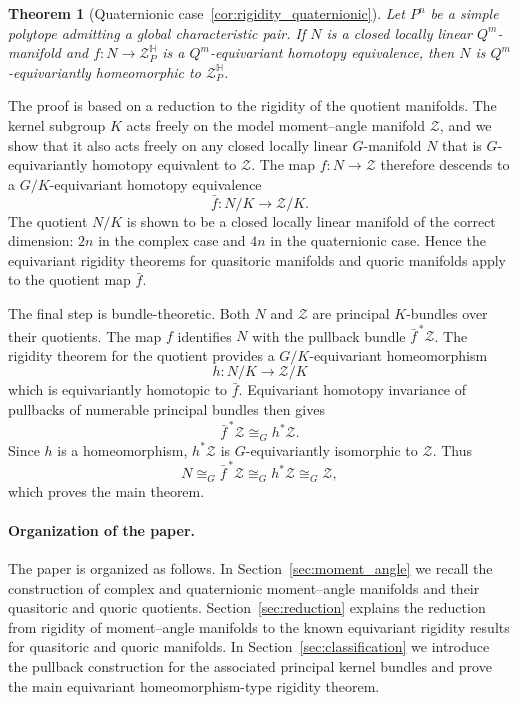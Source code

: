 \documentclass[11pt,a4paper]{article}
\numberwithin{equation}{section}
\newtheorem*{theorem}{Theorem}
\theoremstyle{named}
\begin{document}
\begin{theorem}[Quaternionic case~\ref{cor:rigidity_quaternionic}]
Let \(P^n\) be a simple polytope admitting a global characteristic pair. If \(N\) is a closed locally linear \(Q^m\)-manifold and \(f:N\longrightarrow \mathcal Z_P^{\mathbb H}\) is a \(Q^m\)-equivariant homotopy equivalence, then \(N\) is \(Q^m\)-equivariantly homeomorphic to \(\mathcal Z_P^{\mathbb H}\).
\end{theorem}

The proof is based on a reduction to the rigidity of the quotient manifolds. The kernel subgroup \(K\) acts freely on the model moment--angle manifold \(\mathcal Z\), and we show that it also acts freely on any closed locally linear \(G\)-manifold \(N\) that is \(G\)-equivariantly homotopy equivalent to \(\mathcal Z\). The map \(f:N\to\mathcal Z\) therefore descends to a \(G/K\)-equivariant homotopy equivalence
\[
    \bar f:N/K\longrightarrow \mathcal Z/K.
\]
The quotient \(N/K\) is shown to be a closed locally linear manifold of the correct dimension: \(2n\) in the complex case and \(4n\) in the quaternionic case. Hence the equivariant rigidity theorems for quasitoric manifolds \cite{mp} and quoric manifolds \cite{gp} apply to the quotient map \(\bar f\).

The final step is bundle-theoretic. Both \(N\) and \(\mathcal Z\) are principal \(K\)-bundles over their quotients. The map \(f\) identifies \(N\) with the pullback bundle \(\bar f^{\,*}\mathcal Z\). The rigidity theorem for the quotient provides a \(G/K\)-equivariant homeomorphism
\[
    h:N/K\longrightarrow \mathcal Z/K
\]
which is equivariantly homotopic to \(\bar f\). Equivariant homotopy invariance of pullbacks of numerable principal bundles then gives
\[
    \bar f^{\,*}\mathcal Z\cong_G h^*\mathcal Z.
\]
Since \(h\) is a homeomorphism, \(h^*\mathcal Z\) is
\(G\)-equivariantly isomorphic to \(\mathcal Z\).  Thus
\[
    N
    \cong_G
    \bar f^{\,*}\mathcal Z
    \cong_G
    h^*\mathcal Z
    \cong_G
    \mathcal Z,
\]
which proves the main theorem.

\medskip

\paragraph{Organization of the paper.}
The paper is organized as follows.  In Section~\ref{sec:moment_angle} we recall the construction of complex and quaternionic moment--angle manifolds and their quasitoric and quoric quotients.  Section~\ref{sec:reduction} explains the reduction from rigidity of moment--angle manifolds to the known equivariant rigidity results for quasitoric and quoric manifolds. In Section~\ref{sec:classification} we introduce the pullback construction for the associated principal kernel bundles and prove the main equivariant homeomorphism-type rigidity theorem.
\end{document}
